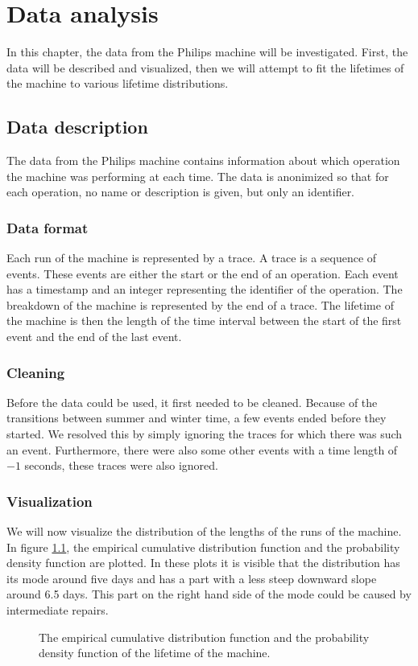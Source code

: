 \chapter{Data analysis}\label{chapter:DataAnalysis}
In this chapter, the data from the Philips machine will be investigated.
First, the data will be described and visualized, then we will attempt to fit the lifetimes of the machine to various lifetime distributions.
\section{Data description}
The data from the Philips machine contains information about which operation the machine was performing at each time.
The data is anonimized so that for each operation, no name or description is given, but only an identifier.
\subsection{Data format}
Each run of the machine is represented by a trace.
A trace is a sequence of events.
These events are either the start or the end of an operation.
Each event has a timestamp and an integer representing the identifier of the operation.
The breakdown of the machine is represented by the end of a trace.
The lifetime of the machine is then the length of the time interval between the start of the first event and the end of the last event.

\subsection{Cleaning}
Before the data could be used, it first needed to be cleaned.
Because of the transitions between summer and winter time, a few events ended before they started.
We resolved this by simply ignoring the traces for which there was such an event.
Furthermore, there were also some other events with a time length of $-1$ seconds, these traces were also ignored.

\subsection{Visualization}
We will now visualize the distribution of the lengths of the runs of the machine.
In figure \ref{figure:distribution}, the empirical cumulative distribution function and the probability density function are plotted.
In these plots it is visible that the distribution has its mode around five days and has a part with a less steep downward slope around 6.5 days.
This part on the right hand side of the mode could be caused by intermediate repairs.
\begin{figure}[H]\label{figure:distribution} 
	\setlength{}
	
	\setlength{}
	
	\caption{The empirical cumulative distribution function and the probability density function of the lifetime of the machine.}
\end{figure}

